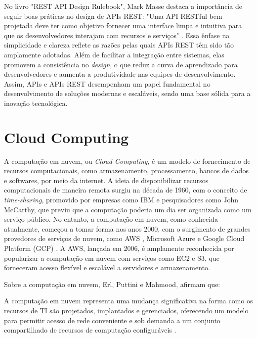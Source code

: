 No livro "REST API Design Rulebook", Mark Masse destaca a importância de seguir boas práticas no design de APIs REST: "Uma API RESTful bem projetada deve ter como objetivo fornecer uma interface limpa e intuitiva para que os desenvolvedores interajam com recursos e serviços" \cite{masse2011rest}. Essa ênfase na simplicidade e clareza reflete as razões pelas quais APIs REST têm sido tão amplamente adotadas. Além de facilitar a integração entre sistemas, elas promovem a consistência no \textit{design}, o que reduz a curva de aprendizado para desenvolvedores e aumenta a produtividade nas equipes de desenvolvimento. Assim, APIs e APIs REST desempenham um papel fundamental no desenvolvimento de soluções modernas e escaláveis, sendo uma base sólida para a inovação tecnológica.

\section{Cloud Computing}

A computação em nuvem, ou \textit{Cloud Computing}, é um modelo de fornecimento de recursos computacionais, como armazenamento, processamento, bancos de dados e softwares, por meio da internet. A ideia de disponibilizar recursos computacionais de maneira remota surgiu na década de 1960, com o conceito de \textit{time-sharing}, promovido por empresas como IBM e pesquisadores como John McCarthy, que previu que a computação poderia um dia ser organizada como um serviço público. No entanto, a computação em nuvem, como conhecida atualmente, começou a tomar forma nos anos 2000, com o surgimento de grandes provedores de serviços de nuvem, como \acrfull{AWS} \cite{AWS}, Microsoft Azure \cite{AZURE} e Google Cloud Platform (GCP) \cite{GCP}. A AWS, lançada em 2006, é amplamente reconhecida por popularizar a computação em nuvem com serviços como \acrfull{EC2} e \acrfull{S3}, que forneceram acesso flexível e escalável a servidores e armazenamento.

Sobre a computação em nuvem, Erl, Puttini e Mahmood, afirmam que:
\begin{citacao}
	A computação em nuvem representa uma mudança significativa na forma como os recursos de TI são projetados, implantados e gerenciados, oferecendo um modelo para permitir acesso de rede conveniente e sob demanda a um conjunto compartilhado de recursos de computação configuráveis \cite{Erl2013}.
\end{citacao}

